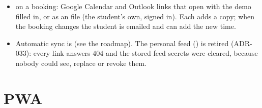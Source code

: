 \begin{itemize}
  \item {} on a booking: Google Calendar and Outlook links that open with the demo filled in, or  as an  file (the student's own, signed in). Each adds a copy; when the booking changes the student is emailed and can add the new time.
  \item Automatic sync is  (see the roadmap). The personal feed () is retired (ADR-033): every link answers 404 and the stored feed secrets were cleared, because nobody could see, replace or revoke them.
\end{itemize}

\section{PWA}

